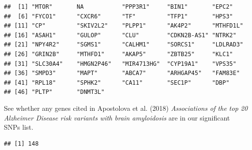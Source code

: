 \documentclass[]{article}
\newenvironment{Shaded}{\begin{snugshade}}{\end{snugshade}}
\newcommand{\KeywordTok}[1]{\textcolor[rgb]{0.13,0.29,0.53}{\textbf{#1}}}
\newcommand{\StringTok}[1]{\textcolor[rgb]{0.31,0.60,0.02}{#1}}
\newcommand{\CommentTok}[1]{\textcolor[rgb]{0.56,0.35,0.01}{\textit{#1}}}
\newcommand{\OperatorTok}[1]{\textcolor[rgb]{0.81,0.36,0.00}{\textbf{#1}}}
\newcommand{\NormalTok}[1]{#1}
\begin{document}
\begin{verbatim}
##  [1] "MTOR"       NA           "PPP3R1"     "BIN1"       "EPC2"      
##  [6] "FYCO1"      "CXCR6"      "TF"         "TFP1"       "HPS3"      
## [11] "CP"         "SKIV2L2"    "PLPP1"      "AK4P2"      "MTHFD1L"   
## [16] "ASAH1"      "GULOP"      "CLU"        "CDKN2B-AS1" "NTRK2"     
## [21] "NPY4R2"     "SGMS1"      "CALHM1"     "SORCS1"     "LDLRAD3"   
## [26] "GRIN2B"     "MTHFD1"     "AKAP5"      "ZBTB25"     "KLC1"      
## [31] "SLC30A4"    "HMGN2P46"   "MIR4713HG"  "CYP19A1"    "VPS35"     
## [36] "SMPD3"      "MAPT"       "ABCA7"      "ARHGAP45"   "FAM83E"    
## [41] "RPL18"      "SPHK2"      "CA11"       "SEC1P"      "DBP"       
## [46] "PLTP"       "DNMT3L"
\end{verbatim}

See whether any genes cited in Apostolova et al. (2018)
\emph{Associations of the top 20 Alzheimer Disease risk variants with
brain amyloidosis} are in our significant SNPs list.

\begin{Shaded}
\end{Shaded}

\begin{verbatim}
## [1] 148
\end{verbatim}

\begin{Shaded}
\end{Shaded}
\end{document}
